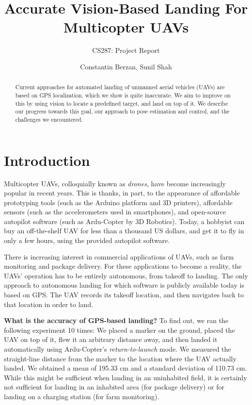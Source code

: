 \documentclass[10pt]{scrartcl} %
\title{Accurate Vision-Based Landing For Multicopter UAVs}
\subtitle{CS287: Project Report}
\author{Constantin Berzan, Sunil Shah}
\date{}
\begin{document}
\maketitle

\begin{abstract}
Current approaches for automated landing of unmanned aerial vehicles (UAVs) are
based on GPS localization, which we show is quite inaccurate. We aim to improve
on this by using vision to locate a predefined target, and land on top of it.
We describe our progress towards this goal, our approach to pose estimation and
control, and the challenges we encountered.
\end{abstract}

\section{Introduction}

Multicopter UAVs, colloquially known as \textit{drones}, have become
increasingly popular in recent years. This is thanks, in part, to the
appearance of affordable prototyping tools (such as the Arduino platform and 3D
printers), affordable sensors (such as the accelerometers used in smartphones),
and open-source autopilot software (such as Ardu-Copter by 3D Robotics). Today,
a hobbyist can buy an off-the-shelf UAV for less than a thousand US dollars,
and get it to fly in only a few hours, using the provided autopilot software.

There is increasing interest in commercial applications of UAVs, such as farm
monitoring and package delivery. For these applications to become a reality,
the UAVs' operation has to be entirely autonomous, from takeoff to landing. The
only approach to autonomous landing for which software is publicly available
today is based on GPS. The UAV records its takeoff location, and then navigates
back to that location in order to land.

{\bf What is the accuracy of GPS-based landing?} To find out, we ran the
following experiment 10 times: We placed a marker on the ground, placed the UAV
on top of it, flew it an arbitrary distance away, and then landed it
automatically using Ardu-Copter's \textit{return-to-launch} mode. We measured
the straight-line distance from the marker to the location where the UAV
actually landed. We obtained a mean of 195.33 cm and a standard deviation of
110.73 cm. While this might be sufficient when landing in an uninhabited field,
it is certainly not sufficient for landing in an inhabited area (for package
delivery) or for landing on a charging station (for farm monitoring).
\end{document}
